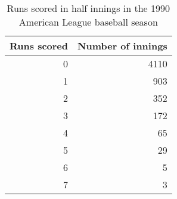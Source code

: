 \begin{table}[htb]
\caption{Runs scored in half innings in the 1990 American League baseball season}
\label{tab:runs}
 \begin{center}
  \begin{tabular}{rr}
  \hline
Runs scored & Number of innings \\
  \hline
0 & 4110 \\
1 & 903 \\
2 & 352 \\
3 & 172 \\
4 & 65 \\
5 & 29 \\
6 & 5 \\
7 & 3 \\
  \hline
  \end{tabular}
 \end{center}
\end{table}
